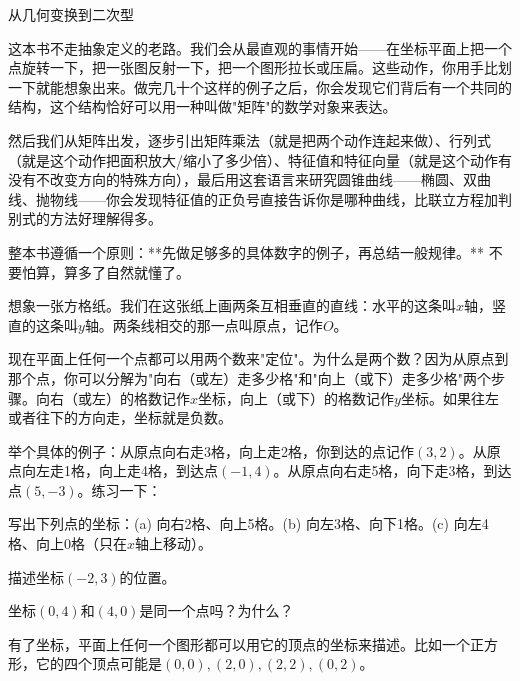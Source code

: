 \documentclass[a4paper,12pt]{ctexart}
\begin{document}
\pagestyle{empty}

\begin{center}
  \large 从几何变换到二次型
\end{center}
\vspace{0.3cm}


这本书不走抽象定义的老路。我们会从最直观的事情开始——在坐标平面上把一个点旋转一下，把一张图反射一下，把一个图形拉长或压扁。这些动作，你用手比划一下就能想象出来。做完几十个这样的例子之后，你会发现它们背后有一个共同的结构，这个结构恰好可以用一种叫做"矩阵"的数学对象来表达。

然后我们从矩阵出发，逐步引出矩阵乘法（就是把两个动作连起来做）、行列式（就是这个动作把面积放大/缩小了多少倍）、特征值和特征向量（就是这个动作有没有不改变方向的特殊方向），最后用这套语言来研究圆锥曲线——椭圆、双曲线、抛物线——你会发现特征值的正负号直接告诉你是哪种曲线，比联立方程加判别式的方法好理解得多。

整本书遵循一个原则：**先做足够多的具体数字的例子，再总结一般规律。** 不要怕算，算多了自然就懂了。

\newpage



想象一张方格纸。我们在这张纸上画两条互相垂直的直线：水平的这条叫$x$轴，竖直的这条叫$y$轴。两条线相交的那一点叫原点，记作$O$。

现在平面上任何一个点都可以用两个数来"定位"。为什么是两个数？因为从原点到那个点，你可以分解为"向右（或左）走多少格"和"向上（或下）走多少格"两个步骤。向右（或左）的格数记作$x$坐标，向上（或下）的格数记作$y$坐标。如果往左或者往下的方向走，坐标就是负数。

举个具体的例子：从原点向右走3格，向上走2格，你到达的点记作$(3,2)$。从原点向左走1格，向上走4格，到达点$(-1,4)$。从原点向右走5格，向下走3格，到达点$(5,-3)$。练习一下：

\begin{exercise}
\item 写出下列点的坐标：(a) 向右2格、向上5格。(b) 向左3格、向下1格。(c) 向左4格、向上0格（只在$x$轴上移动）。
\item 描述坐标$(-2,3)$的位置。
\item 坐标$(0,4)$和$(4,0)$是同一个点吗？为什么？
\end{exercise}

有了坐标，平面上任何一个图形都可以用它的顶点的坐标来描述。比如一个正方形，它的四个顶点可能是$(0,0),(2,0),(2,2),(0,2)$。
\end{document}
